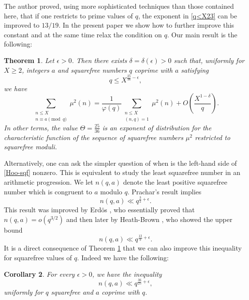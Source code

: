\documentclass[a4paper, 11pt]{amsart}
\theoremstyle{plain}
\newtheorem{thm}{Theorem}[section]
\newtheorem{cor}[thm]{Corollary}
\theoremstyle{definition}
\newcommand{\rmod}{\!\!\!\!\pmod}
\begin{document}
The author \citep{nunes2016squarefree} proved, using more sophisticated techniques than those contained here, that if one restricts to prime values of $q$, the exponent in \eqref{q<X23} can be improved to $13/19$. In the present paper we show how to further improve this constant and at the same time relax the condition on $q$. Our main result is the following:
%
\begin{thm}\label{25/36}
Let $\epsilon>0$. Then there exists $\delta=\delta(\epsilon)>0$ such that, uniformly for $X\geq 2$, integers $a$ and squarefree numbers $q$ coprime with $a$ satisfying
$$
q\leq X^{\frac{25}{36}-\epsilon},
$$
we have
\begin{equation}\label{asform}
\sum_{\substack{n\leq X\\n \equiv a\rmod q}}\mu^2(n) = \frac{1}{\varphi(q)}\sum_{\substack{n\leq X\\(n,q)=1}}\mu^2(n) + O\left(\frac{X^{1-\delta}}{q}\right).
\end{equation}
In other terms, the value $\Theta=\frac{25}{36}$ is an exponent of distribution for the characteristic function of the sequence of squarefree numbers $\mu^2$ restricted to squarefree moduli.
\end{thm}
%
Alternatively, one can ask the simpler question of when is the left-hand side of \eqref{Hoo-sqf} nonzero. This is equivalent to study the least squarefree number in an arithmetic progression. We let $n(q,a)$ denote the least positive squarefree number which is congruent to $a$ modulo $q$. Prachar's result implies
%
\begin{equation}\label{3/2}
n(q,a)\ll q^{\frac32+\epsilon}.
\end{equation}
%
This result was improved by Erd\"os \citep{erdos1960kleinste}, who essentially proved that $n(q,a)=o(q^{3/2})$ and then later by Heath-Brown \citep{heath1982least}, who showed the upper bound
%
\begin{equation}\label{13/9}
n(q,a)\ll q^{\frac{13}{9}+\epsilon}.
\end{equation}
%
It is a direct consequence of Theorem \ref{25/36} that we can also improve this inequality for squarefree values of $q$. Indeed we have the following:



\begin{cor}\label{least}
For every $\epsilon>0$, we have the inequality
%
$$
n(q,a)\ll q^{\frac{36}{25} +\epsilon},
$$
uniformly for $q$ squarefree and $a$ coprime with $q$.
\end{cor}
\end{document}
